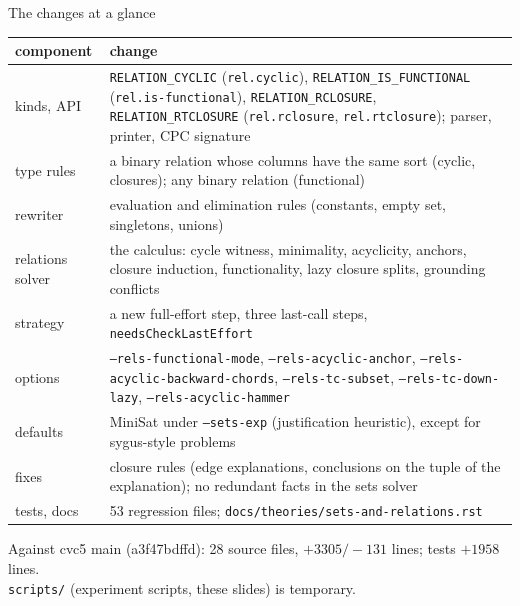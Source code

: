 \documentclass[aspectratio=169]{beamer}
\newcommand{\sm}[1]{\texttt{#1}}
\newcommand{\new}[1]{\textcolor{newc}{#1}}
\begin{document}
\begin{frame}{The changes at a glance}
  \scriptsize
  \begin{tabular}{@{}lL{11.2cm}@{}}
    \toprule
    component & change \\
    \midrule
    kinds, API & \new{\sm{RELATION\_CYCLIC}} (\sm{rel.cyclic}), \new{\sm{RELATION\_IS\_FUNCTIONAL}}
      (\sm{rel.is-functional}), \sm{RELATION\_RCLOSURE}, \sm{RELATION\_RTCLOSURE}
      (\sm{rel.rclosure}, \sm{rel.rtclosure}); parser, printer, CPC signature \\
    type rules & a binary relation whose columns have the same sort (cyclic, closures);
      any binary relation (functional) \\
    rewriter & evaluation and elimination rules (constants, empty set, singletons, unions) \\
    relations solver & \new{the calculus}: cycle witness, minimality, acyclicity, anchors,
      closure induction, functionality, lazy closure splits, grounding conflicts \\
    strategy & a new full-effort step, three last-call steps, \sm{needsCheckLastEffort} \\
    options & \sm{--rels-functional-mode}, \sm{--rels-acyclic-anchor},
      \sm{--rels-acyclic-backward-chords}, \sm{--rels-tc-subset}, \sm{--rels-tc-down-lazy},
      \sm{--rels-acyclic-hammer} \\
    defaults & MiniSat under \sm{--sets-exp} (justification heuristic), except for sygus-style problems \\
    fixes & closure rules (edge explanations, conclusions on the tuple of the explanation);
      no redundant facts in the sets solver \\
    tests, docs & 53 regression files; \sm{docs/theories/sets-and-relations.rst} \\
    \bottomrule
  \end{tabular}
  \medskip

  Against cvc5 main (a3f47bdffd): 28 source files, $+3305/-131$ lines; tests $+1958$ lines.\\
  \sm{scripts/} (experiment scripts, these slides) is temporary.
\end{frame}
\end{document}
